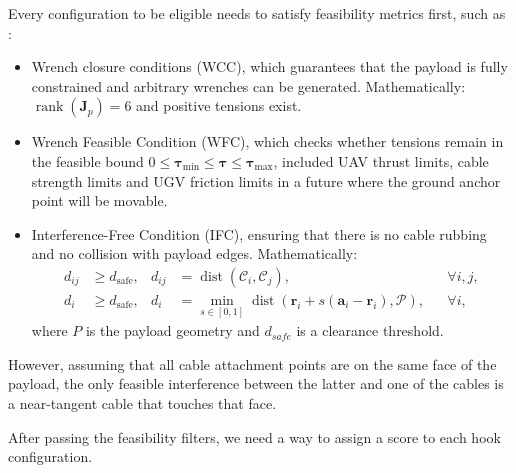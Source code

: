 \noindent Every configuration to be eligible needs to satisfy feasibility metrics first, such as \cite{cheng_cable_2023}:
\begin{itemize}
    \item Wrench closure conditions (WCC), which guarantees that the payload is fully constrained and arbitrary wrenches can be generated. Mathematically:
    $
    \operatorname{rank}(\mathbf{J}_p)=6
    $
    and positive tensions exist.
    \item Wrench Feasible Condition (WFC), which checks whether tensions remain in the feasible bound $0\le \boldsymbol{\tau}_{\text{min}} \le \boldsymbol{\tau} \le \boldsymbol{\tau}_{\text{max}}$, included UAV thrust limits, cable strength limits and UGV friction limits in a future where the ground anchor point will be movable.
    \item Interference-Free Condition (IFC), ensuring that there is no cable rubbing and no collision with payload edges. Mathematically:
    \begin{equation}
        \begin{aligned}
    d_{ij} &\ge d_{\mathrm{safe}},
    &
    d_{ij} &= \operatorname{dist} \left( \mathcal{C}_i,\mathcal{C}_j \right),
    && \forall i,j,
    \\[2mm]
    d_i & \ge d_{\mathrm{safe}},
    & d_i &= \min_{s\in[0,1]} \operatorname{dist} \left( \mathbf{r}_i + s(\mathbf{a}_i-\mathbf{r}_i), \mathcal{P} \right),
    && \forall i,
\end{aligned}
        \label{eq:IFCconstraint}
    \end{equation}
    where $P$ is the payload geometry and $d_{safe}$ is a clearance threshold.
\end{itemize}

However, assuming that all cable attachment points are on the same face of the payload, the only feasible interference between the latter and one of the cables is a near-tangent cable that touches that face. 

After passing the feasibility filters, we need a way to assign a score to each hook configuration.

